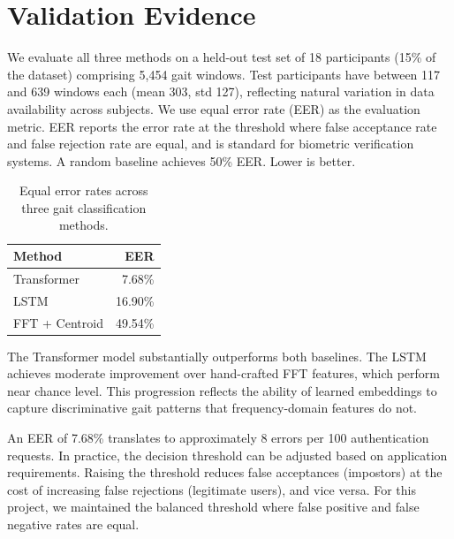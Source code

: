 \section{Validation Evidence}

We evaluate all three methods on a held-out test set of 18 participants (15\% of the dataset) comprising 5,454 gait windows. Test participants have between 117 and 639 windows each (mean 303, std 127), reflecting natural variation in data availability across subjects. We use equal error rate (EER) as the evaluation metric. EER reports the error rate at the threshold where false acceptance rate and false rejection rate are equal, and is standard for biometric verification systems. A random baseline achieves 50\% EER. Lower is better.

\begin{table}[h]
  \centering
  \begin{tabular}{lr}
    \toprule
    Method & EER \\
    \midrule
    Transformer & 7.68\% \\
    LSTM & 16.90\% \\
    FFT + Centroid & 49.54\% \\
    \bottomrule
  \end{tabular}
  \caption{Equal error rates across three gait classification methods.}
\end{table}

The Transformer model substantially outperforms both baselines. The LSTM achieves moderate improvement over hand-crafted FFT features, which perform near chance level. This progression reflects the ability of learned embeddings to capture discriminative gait patterns that frequency-domain features do not.

An EER of 7.68\% translates to approximately 8 errors per 100 authentication requests. In practice, the decision threshold can be adjusted based on application requirements. Raising the threshold reduces false acceptances (impostors) at the cost of increasing false rejections (legitimate users), and vice versa. For this project, we maintained the balanced threshold where false positive and false negative rates are equal.
